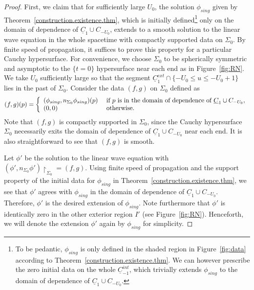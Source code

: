 \documentclass[12 pt, reqno]{amsart}
\theoremstyle{definition}
\theoremstyle{remark}
\numberwithin{equation}{section}
\newcommand{\set}[1]{\{#1\}}
\newcommand{\0}{\emptyset}
\newcommand{\Sgm}{\Sigma}
\newcommand{\uC}{\underline{C}}
\begin{document}
\begin{proof}
First, we claim that for sufficiently large $U_{0}$, the solution $\phi_{sing}$ given by Theorem~\ref{construction.existence.thm}, which is initially defined\footnote{To be pedantic, $\phi_{sing}$ is only defined in the shaded region in Figure~\ref{fig:data} according to Theorem~\ref{construction.existence.thm}. We can however prescribe the zero initial data on the whole $\uC_{-1}^{int}$, which trivially extends $\phi_{sing}$ to the domain of dependence of $\uC_{1} \cup C_{-U_{0}}$.} only on the domain of dependence of $\uC_{1} \cup C_{-U_{0}}$, extends to a smooth solution to the linear wave equation in the whole spacetime with compactly supported data on $\Sgm_{0}$. By finite speed of propagation, it suffices to prove this property for a particular Cauchy hypersurface. For convenience, we choose $\Sgm_{0}$ to be spherically symmetric and asymptotic to the $\set{t=0}$ hypersurface near each end as in Figure~\ref{fig:RN}. We take $U_{0}$ sufficiently large so that the segment $\uC_{1}^{ext} \cap \set{-U_{0} \leq u \leq -U_{0}+1}$ lies in the past of $\Sgm_{0}$. Consider the data $(f, g)$ on $\Sgm_{0}$ defined as
\begin{equation*}
	(f, g) (p) = \left\{
	\begin{array}{ll}
	(\phi_{sing}, n_{\Sgm_{0}} \phi_{sing})(p) & \hbox{ if $p$ is in the domain of dependence of $\uC_{1} \cup C_{-U_{0}}$},  \\
	(0, 0) & \hbox{ otherwise.} 
	\end{array}
	\right.
\end{equation*}
Note that $(f, g)$ is compactly supported in $\Sgm_{0}$, since the Cauchy hypersurface $\Sgm_{0}$ necessarily exits the domain of dependence of $\uC_{1} \cup C_{-U_{0}}$ near each end. It is also straightforward to see that $(f, g)$ is smooth.

Let $\phi'$ be the solution to the linear wave equation with $(\phi', n_{\Sgm_{0}} \phi') \restriction_{\Sgm_{0}} = (f, g)$. Using finite speed of propagation and the support property of the initial data for $\phi_{sing}$ in Theorem~\ref{construction.existence.thm}, we see that $\phi'$ agrees with $\phi_{sing}$ in the domain of dependence of $\uC_{1} \cup C_{-U_{0}}$. Therefore, $\phi'$ is the desired extension of $\phi_{sing}$. Note furthermore that $\phi'$ is identically zero in the other exterior region $I'$ (see Figure~\ref{fig:RN}).
Henceforth, we will denote the extension $\phi'$ again by $\phi_{sing}$ for simplicity.


\end{proof}
\end{document}
